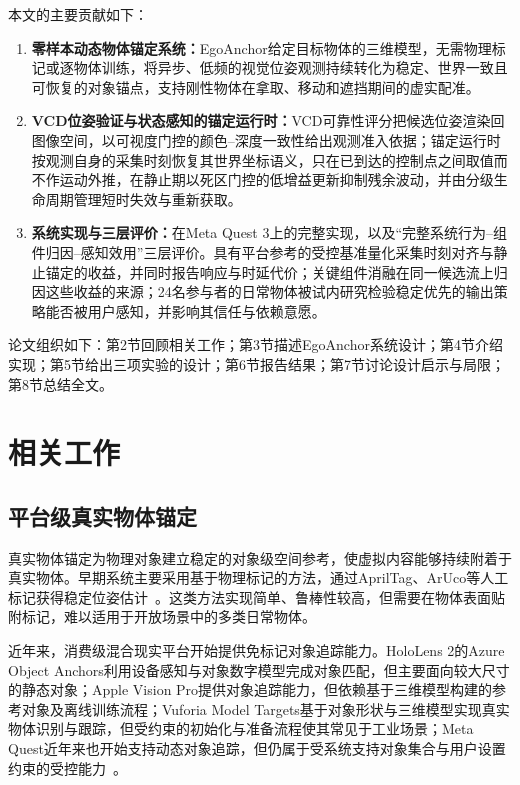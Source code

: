 \documentclass[review]{vgtc}
\begin{document}
本文的主要贡献如下：

\begin{enumerate}
  \item \textbf{零样本动态物体锚定系统：}EgoAnchor给定目标物体的三维模型，无需物理标记或逐物体训练，将异步、低频的视觉位姿观测持续转化为稳定、世界一致且可恢复的对象锚点，支持刚性物体在拿取、移动和遮挡期间的虚实配准。

  \item \textbf{VCD位姿验证与状态感知的锚定运行时：}VCD可靠性评分把候选位姿渲染回图像空间，以可视度门控的颜色--深度一致性给出观测准入依据；锚定运行时按观测自身的采集时刻恢复其世界坐标语义，只在已到达的控制点之间取值而不作运动外推，在静止期以死区门控的低增益更新抑制残余波动，并由分级生命周期管理短时失效与重新获取。

  \item \textbf{系统实现与三层评价：}在Meta Quest 3上的完整实现，以及“完整系统行为--组件归因--感知效用”三层评价。具有平台参考的受控基准量化采集时刻对齐与静止锚定的收益，并同时报告响应与时延代价；关键组件消融在同一候选流上归因这些收益的来源；24名参与者的日常物体被试内研究检验稳定优先的输出策略能否被用户感知，并影响其信任与依赖意愿。
\end{enumerate}

论文组织如下：第2节回顾相关工作；第3节描述EgoAnchor系统设计；第4节介绍实现；第5节给出三项实验的设计；第6节报告结果；第7节讨论设计启示与局限；第8节总结全文。

\section{相关工作}\label{sec:related-work}

\subsection{平台级真实物体锚定}

真实物体锚定为物理对象建立稳定的对象级空间参考，使虚拟内容能够持续附着于真实物体。早期系统主要采用基于物理标记的方法，通过AprilTag、ArUco等人工标记获得稳定位姿估计~\cite{kato1999artoolkit,olson2011apriltag,garridojurado2014aruco}。这类方法实现简单、鲁棒性较高，但需要在物体表面贴附标记，难以适用于开放场景中的多类日常物体。

近年来，消费级混合现实平台开始提供免标记对象追踪能力。HoloLens 2的Azure Object Anchors利用设备感知与对象数字模型完成对象匹配，但主要面向较大尺寸的静态对象；Apple Vision Pro提供对象追踪能力，但依赖基于三维模型构建的参考对象及离线训练流程；Vuforia Model Targets基于对象形状与三维模型实现真实物体识别与跟踪，但受约束的初始化与准备流程使其常见于工业场景；Meta Quest近年来也开始支持动态对象追踪，但仍属于受系统支持对象集合与用户设置约束的受控能力~\cite{appleObjectAnchor,azureObjectAnchors,vuforiaModelTargets,metaDynamicObjectTracker}。
\end{document}
